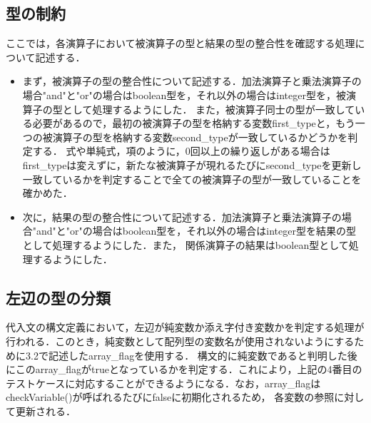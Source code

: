 \documentclass[dvipdfmx]{jarticle}
\begin{document}
\subsection{型の制約}
ここでは，各演算子において被演算子の型と結果の型の整合性を確認する処理について記述する．
\begin{itemize}
  \item まず，被演算子の型の整合性について記述する．加法演算子と乗法演算子の場合"and"と"or"の場合はboolean型を，それ以外の場合はinteger型を，被演算子の型として処理するようにした．
  また，被演算子同士の型が一致している必要があるので，最初の被演算子の型を格納する変数first\_typeと，もう一つの被演算子の型を格納する変数second\_typeが一致しているかどうかを判定する．
  式や単純式，項のように，0回以上の繰り返しがある場合はfirst\_typeは変えずに，新たな被演算子が現れるたびにsecond\_typeを更新し一致しているかを判定することで全ての被演算子の型が一致していることを確かめた．
  
  \item 次に，結果の型の整合性について記述する．加法演算子と乗法演算子の場合"and"と"or"の場合はboolean型を，それ以外の場合はinteger型を結果の型として処理するようにした．また，
  関係演算子の結果はboolean型として処理するようにした．
\end{itemize}
\subsection{左辺の型の分類}
代入文の構文定義において，左辺が純変数か添え字付き変数かを判定する処理が行われる．このとき，純変数として配列型の変数名が使用されないようにするために3.2で記述したarray\_flagを使用する．
構文的に純変数であると判明した後にこのarray\_flagがtrueとなっているかを判定する．これにより，上記の4番目のテストケースに対応することができるようになる．なお，array\_flagはcheckVariable()が呼ばれるたびにfalseに初期化されるため，
各変数の参照に対して更新される．
\end{document}
